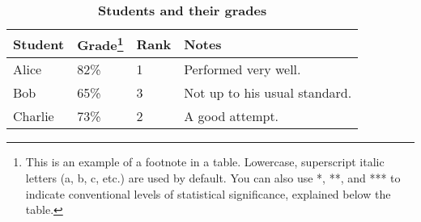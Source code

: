 \documentclass[9pt,twocolumn,twoside]{gsajnl}
\begin{document}
\begin{table*}[htbp]
\centering
\caption{\bf Students and their grades}
\begin{tableminipage}{\textwidth}
\begin{tabularx}{\textwidth}{XXXX}
\hline
Student & Grade\footnote{This is an example of a footnote in a table. Lowercase, superscript italic letters (a, b, c, etc.) are used by default. You can also use *, **, and *** to indicate conventional levels of statistical significance, explained below the table.} & Rank & Notes \\
\hline
Alice & 82\% & 1 & Performed very well.\\
Bob & 65\% & 3 & Not up to his usual standard.\\
Charlie & 73\% & 2 & A good attempt.\\
\hline
\end{tabularx}
  \label{tab:shape-functions}
\end{tableminipage}
\end{table*}


\end{document}
